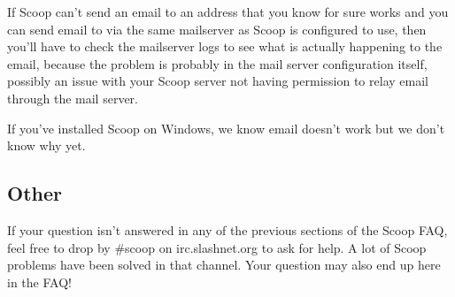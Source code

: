 If Scoop can't send an email to an address that you know for sure works and you can send email to via the same mailserver as Scoop is configured to use, then you'll have to check the mailserver logs to see what is actually happening to the email, because the problem is probably in the mail server configuration itself, possibly an issue with your Scoop server not having permission to relay email through the mail server.

If you've installed Scoop on Windows, we know email doesn't work but we don't know why yet.

\subsection{Other}

If your question isn't answered in any of the previous sections of the Scoop FAQ, feel free to drop by \#scoop on irc.slashnet.org to ask for help. A lot of Scoop problems have been solved in that channel. Your question may also end up here in the FAQ!

